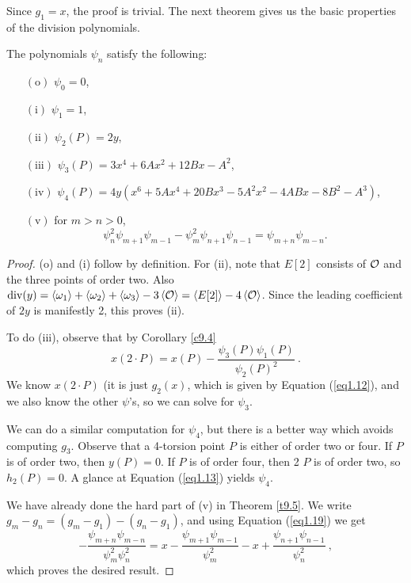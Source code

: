 Since $g_{1}=x$, the proof is trivial. The next theorem gives us the basic properties of the division polynomials.

\begin{theo}
\label{t9.5}
The polynomials $\psi_{n}$ satisfy the following:
\begin{itemize}
\item[$\mathrm{(o)}$]
$\psi_{0}=0$,
\item[$\mathrm{(i)}$]
$\psi_{1}=1$,
\item[$\mathrm{(ii)}$]
$\psi_{2}(P)=2y$,
\item[$\mathrm{(iii)}$]
$\psi_{3}(P)=3x^{4}+6Ax^{2}+12Bx-A^{2}$,
\item[$\mathrm{(iv)}$]
$\psi_{4}(P)=4y(x^{6}+5Ax^{4}+20Bx^{3}-5A^{2}x^{2}-4ABx-8B^{2}-A^{3})$,
\item[$\mathrm{(v)}$]
for $m>n>0$,
\begin{equation}
\label{eq1.21}
\psi_{n}^{2}\psi_{m+1}\psi_{m-1}-\psi_{m}^{2}\psi_{n+1}\psi_{n-1}=\psi_{m+n}\psi_{m-n} .
\end{equation}
\end{itemize}
\end{theo}
\begin{proof} (o) and (i) follow by definition. For (ii), note that $E[2]$ consists of $\mathcal{O}$ and the three points of order two. Also $\operatorname{div}(y)=\left\langle \omega_{1} \right \rangle + \left\langle \omega_{2} \right \rangle + \left\langle \omega_{3} \right \rangle - 3\left\langle \mathcal{O} \right \rangle = \left\langle E[2] \right \rangle - 4\left\langle \mathcal{O} \right \rangle$. Since the leading coefficient of $2y$ is manifestly 2, this proves (ii).

To do (iii), observe that by Corollary \ref{c9.4}
$$
x(2\cdot P)=x(P)-\frac{\psi_{3}(P)\psi_{1}(P)}{\psi_{2}(P)^{2}}\ .
$$
We know $x(2\cdot P)$ (it is just $g_{2}(x)$, which is given by Equation (\ref{eq1.12}), and we also know the other $\psi$'s, so we can solve for $\psi_{3}$.

We can do a similar computation for $\psi_{4}$, but there is a better way which avoids computing $g_{3}$. Observe that a 4-torsion point $P$ is either of order two or four. If $P$ is of order two, then $y(P)=0$. If $P$ is of order four, then 2 $P$ is of order two, so $h_{2}(P)=0$. A glance at Equation (\ref{eq1.13}) yields $\psi_{4}$.

We have already done the hard part of (v) in Theorem \ref{t9.5}. We write $g_{m}- g_{n}=(g_{m}-g_{1})-(g_{n}-g_{1})$, and using Equation (\ref{eq1.19}) we get
$$
-\frac{\psi_{m+n}\psi_{m-n}}{\psi_{m}^{2}\psi_{n}^{2}}=x-\frac{\psi_{m+1}\psi_{m-1}}{\psi_{m}^{2}}-x+\frac{\psi_{n+1}\psi_{n-1}}{\psi_{n}^{2}}\ ,
$$
which proves the desired result.
\end{proof}

